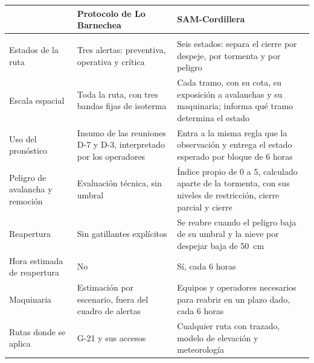\renewcommand{\arraystretch}{1.35}
\begin{tabularx}{\linewidth}{>{\raggedright\arraybackslash}p{4.9cm}>{\raggedright\arraybackslash}X>{\raggedright\arraybackslash}X}
\toprule
 & \textbf{Protocolo de Lo Barnechea} & \textbf{SAM-Cordillera} \\
\midrule
\multicolumn{3}{l}{\cellcolor{fondo}\textit{Qué entrega}} \\
Estados de la ruta & Tres alertas: preventiva, operativa y crítica & Seis estados: separa el cierre por despeje, por tormenta y por peligro \\
Escala espacial & Toda la ruta, con tres bandas fijas de isoterma & Cada tramo, con su cota, su exposición a avalanchas y su maquinaria; informa qué tramo determina el estado \\
Uso del pronóstico & Insumo de las reuniones D-7 y D-3, interpretado por los operadores & Entra a la misma regla que la observación y entrega el estado esperado por bloque de 6 horas \\
Peligro de avalancha y remoción & Evaluación técnica, sin umbral & Índice propio de 0 a 5, calculado aparte de la tormenta, con sus niveles de restricción, cierre parcial y cierre \\
Reapertura & Sin gatillantes explícitos & Se reabre cuando el peligro baja de su umbral y la nieve por despejar baja de 50~cm \\
Hora estimada de reapertura & No & Sí, cada 6 horas \\
Maquinaria & Estimación por escenario, fuera del cuadro de alertas & Equipos y operadores necesarios para reabrir en un plazo dado, cada 6 horas \\
Rutas donde se aplica & G-21 y sus accesos & Cualquier ruta con trazado, modelo de elevación y meteorología \\
\bottomrule
\end{tabularx}

